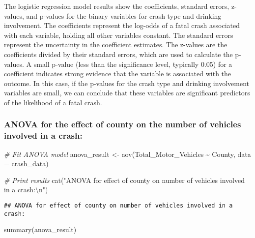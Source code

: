 \documentclass[
]{article}
\newenvironment{Shaded}{\begin{snugshade}}{\end{snugshade}}
\newcommand{\AttributeTok}[1]{\textcolor[rgb]{0.77,0.63,0.00}{#1}}
\newcommand{\CommentTok}[1]{\textcolor[rgb]{0.56,0.35,0.01}{\textit{#1}}}
\newcommand{\FunctionTok}[1]{\textcolor[rgb]{0.00,0.00,0.00}{#1}}
\newcommand{\NormalTok}[1]{#1}
\newcommand{\OtherTok}[1]{\textcolor[rgb]{0.56,0.35,0.01}{#1}}
\newcommand{\SpecialCharTok}[1]{\textcolor[rgb]{0.00,0.00,0.00}{#1}}
\newcommand{\StringTok}[1]{\textcolor[rgb]{0.31,0.60,0.02}{#1}}
\begin{document}
The logistic regression model results show the coefficients, standard
errors, z-values, and p-values for the binary variables for crash type
and drinking involvement. The coefficients represent the log-odds of a
fatal crash associated with each variable, holding all other variables
constant. The standard errors represent the uncertainty in the
coefficient estimates. The z-values are the coefficients divided by
their standard errors, which are used to calculate the p-values. A small
p-value (less than the significance level, typically 0.05) for a
coefficient indicates strong evidence that the variable is associated
with the outcome. In this case, if the p-values for the crash type and
drinking involvement variables are small, we can conclude that these
variables are significant predictors of the likelihood of a fatal crash.

\hypertarget{anova-for-the-effect-of-county-on-the-number-of-vehicles-involved-in-a-crash}{%
\subsubsection{ANOVA for the effect of county on the number of vehicles
involved in a
crash:}\label{anova-for-the-effect-of-county-on-the-number-of-vehicles-involved-in-a-crash}}

\begin{Shaded}
\begin{Highlighting}[]
\CommentTok{\# Fit ANOVA model}
\NormalTok{anova\_result }\OtherTok{\textless{}{-}} \FunctionTok{aov}\NormalTok{(Total\_Motor\_Vehicles }\SpecialCharTok{\textasciitilde{}}\NormalTok{ County, }\AttributeTok{data =}\NormalTok{ crash\_data)}

\CommentTok{\# Print results}
\FunctionTok{cat}\NormalTok{(}\StringTok{"ANOVA for effect of county on number of vehicles involved in a crash:}\SpecialCharTok{\textbackslash{}n}\StringTok{"}\NormalTok{)}
\end{Highlighting}
\end{Shaded}

\begin{verbatim}
## ANOVA for effect of county on number of vehicles involved in a crash:
\end{verbatim}

\begin{Shaded}
\begin{Highlighting}[]
\FunctionTok{summary}\NormalTok{(anova\_result)}
\end{Highlighting}
\end{Shaded}
\end{document}
